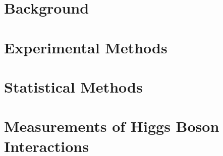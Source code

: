 \part{Background}
\renewcommand{\chaptermark}[1]{\markboth{\MakeUppercase{\partname\ \thepart\ \hfill \chaptername\ \thechapter.\ #1}}{}}




\part{Experimental Methods}






\part{Statistical Methods}




\part{Measurements of Higgs Boson Interactions}




\renewcommand{\chaptermark}[1]{\markboth{\MakeUppercase{\hfill \chaptername\ \thechapter.\ #1}}{}}


